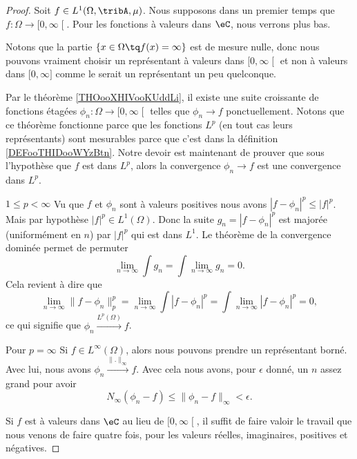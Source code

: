 \begin{proof}
    Soit \( f\in L^1(\Omega,\tribA,\mu)\). Nous supposons dans un premier temps que \( f\colon \Omega\to \mathopen[ 0 , \infty \mathclose[\). Pour les fonctions à valeurs dans \( \eC\), nous verrons plus bas.

    Notons que la partie \( \{ x\in \Omega\tq f(x)=\infty \}\) est de mesure nulle, donc nous pouvons vraiment choisir un représentant à valeurs dans \( \mathopen[ 0 , \infty \mathclose[\) et non à valeurs dans \( \mathopen[ 0 , \infty \mathclose]\) comme le serait un représentant un peu quelconque.

    Par le théorème \ref{THOooXHIVooKUddLi}, il existe une suite croissante de fonctions étagées \( \phi_n\colon \Omega\to \mathopen[ 0 , \infty \mathclose[\) telles que \( \phi_n\to f\) ponctuellement. Notons que ce théorème fonctionne parce que les fonctions \( L^p\) (en tout cas leurs représentants) sont mesurables parce que c'est dans la définition \ref{DEFooTHIDooWYzBtn}.  Notre devoir est maintenant de prouver que sous l'hypothèse que \( f\) est dans \( L^p\), alors la convergence \( \phi_n\to f\) est une convergence dans \( L^p\).

    \begin{subproof}
        \item[\( 1\leq p<\infty\)]
            Vu que \( f\) et \( \phi_n\) sont à valeurs positives nous avons \( | f-\phi_n |^p\leq | f |^p\). Mais par hypothèse \( | f |^p\in L^1(\Omega)\). Donc la suite \( g_n=| f-\phi_n |^p\) est majorée (uniformément en \( n\)) par \( | f |^p\) qui est dans \( L^1\). Le théorème de la convergence dominée permet de permuter
            \begin{equation}
                \lim_{n\to \infty} \int g_n=\int \lim_{n\to \infty} g_n=0.
            \end{equation}
            Cela revient à dire que
            \begin{equation}
                \lim_{n\to \infty} \| f-\phi_n \|^p_p=\lim_{n\to \infty} \int| f-\phi_n |^p=\int\lim_{n\to \infty} | f-\phi_n |^p=0,
            \end{equation}
            ce qui signifie que \( \phi_n\stackrel{L^p(\Omega)}{\longrightarrow}f\).
        \item[Pour \( p=\infty\)]
            Si \( f\in L^{\infty}(\Omega)\), alors nous pouvons prendre un représentant borné. Avec lui, nous avons \( \phi_n\stackrel{\| . \|_{\infty}}{\longrightarrow}f\). Avec cela nous avons, pour \( \epsilon\) donné, un \( n\) assez grand pour avoir
            \begin{equation}
                N_{\infty}(\phi_n-f)\leq \| \phi_n-f \|_{\infty}<\epsilon.
            \end{equation}
    \end{subproof}
    Si \( f\) est à valeurs dans \( \eC\) au lieu de \( \mathopen[ 0 , \infty \mathclose[\), il suffit de faire valoir le travail que nous venons de faire quatre fois, pour les valeurs réelles, imaginaires, positives et négatives.
\end{proof}

